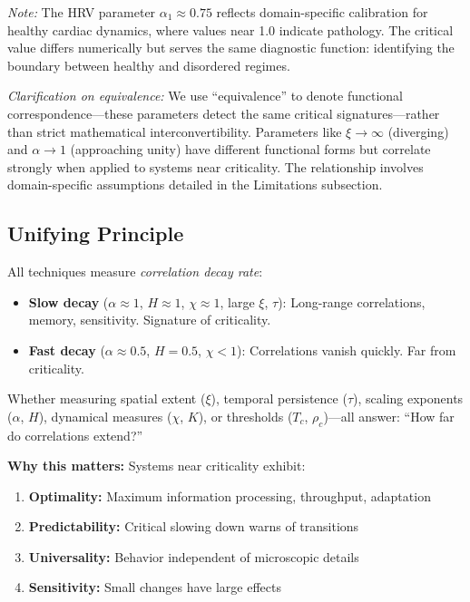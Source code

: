\documentclass[11pt]{article}
\begin{document}
\noindent\textit{Note:} The HRV parameter $\alpha_1 \approx 0.75$ reflects domain-specific calibration for healthy cardiac dynamics, where values near 1.0 indicate pathology. The critical value differs numerically but serves the same diagnostic function: identifying the boundary between healthy and disordered regimes.

\noindent\textit{Clarification on equivalence:} We use ``equivalence'' to denote functional correspondence---these parameters detect the same critical signatures---rather than strict mathematical interconvertibility. Parameters like $\xi \to \infty$ (diverging) and $\alpha \to 1$ (approaching unity) have different functional forms but correlate strongly when applied to systems near criticality. The relationship involves domain-specific assumptions detailed in the Limitations subsection.

\subsection{Unifying Principle}

All techniques measure \textit{correlation decay rate}:
\begin{itemize}
    \item \textbf{Slow decay} ($\alpha \approx 1$, $H \approx 1$, $\chi \approx 1$, large $\xi$, $\tau$): Long-range correlations, memory, sensitivity. Signature of criticality.
    \item \textbf{Fast decay} ($\alpha \approx 0.5$, $H = 0.5$, $\chi < 1$): Correlations vanish quickly. Far from criticality.
\end{itemize}

Whether measuring spatial extent ($\xi$), temporal persistence ($\tau$), scaling exponents ($\alpha$, $H$), dynamical measures ($\chi$, $K$), or thresholds ($T_c$, $\rho_c$)---all answer: ``How far do correlations extend?''

\textbf{Why this matters:} Systems near criticality exhibit:
\begin{enumerate}
    \item \textbf{Optimality:} Maximum information processing, throughput, adaptation
    \item \textbf{Predictability:} Critical slowing down warns of transitions
    \item \textbf{Universality:} Behavior independent of microscopic details
    \item \textbf{Sensitivity:} Small changes have large effects
\end{enumerate}
\end{document}
